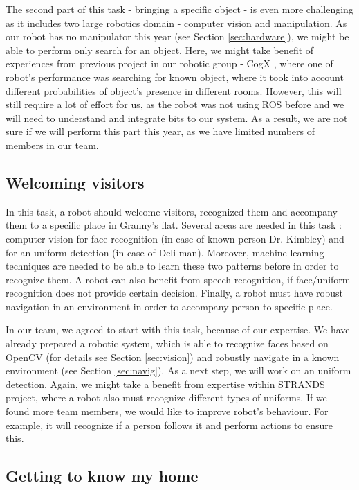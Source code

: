 \documentclass[conference]{IEEEtran}
\begin{document}
The second part of this task - bringing a specific object - is even more challenging as it includes two large robotics domain - computer vision and manipulation. As our robot has no manipulator this year (see Section \ref{sec:hardware}), we might be able to perform only search for an object. Here, we might take benefit of experiences from previous project in our robotic group - CogX \cite{cogx}, where one of robot's performance was searching for known object, where it took into account different probabilities of object's presence in different rooms. However, this will still require a lot of effort for us, as the robot was not using ROS before and we will need to understand and integrate bits to our system. As a result, we are not sure if we will perform this part this year, as we have limited numbers of members in our team.

\subsection{Welcoming visitors}

In this task, a robot should welcome visitors, recognized them and accompany them to a specific place in Granny's flat. Several areas are needed in this task : computer vision for face recognition (in case of known person Dr. Kimbley) and for an uniform detection (in case of Deli-man). Moreover, machine learning techniques are needed to be able to learn these two patterns before in order to recognize them. A robot can also benefit from speech recognition, if face/uniform recognition does not provide certain decision. Finally, a robot must have robust navigation in an environment in order to accompany person to specific place. 

In our team, we agreed to start with this task, because of our expertise. We have already prepared a robotic system, which is able to recognize faces based on OpenCV (for details see Section \ref{sec:vision}) and robustly navigate in a known environment (see Section \ref{sec:navig}). As a next step, we will work on an uniform detection. Again, we might take a benefit from expertise within STRANDS project, where a robot also must recognize different types of uniforms. If we found more team members, we would like to improve robot's behaviour. For example, it will recognize if a person follows it and perform actions to ensure this. 

\subsection{Getting to know my home}
\end{document}
